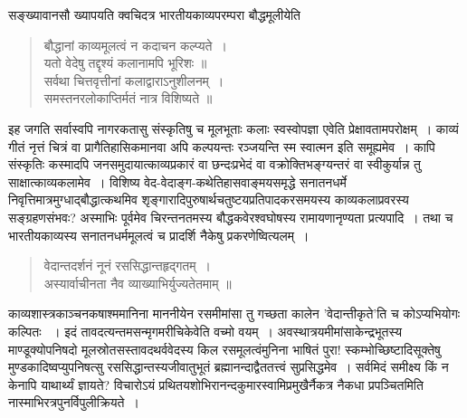 {\dev सङ्ख्यावानसौ ख्यापयति क्वचिदत्र भारतीयकाव्यपरम्परा बौद्धमूलीयेति}
\begin{quote}
{\dev बौद्धानां काव्यमूलत्वं न कदाचन कल्प्यते~।}\\
{\dev यतो वेदेषु तद्दृश्यं कलानामपि भूरिशः ॥}\\[5pt]
{\dev सर्वथा चित्तवृत्तीनां कलाद्वाराऽनुशीलनम्~।}\\
{\dev समस्तनरलोकाप्तिर्मतं नात्र विशिष्यते ॥}
\end{quote}

{\dev इह जगति सर्वास्वपि नागरकतासु संस्कृतिषु च मूलभूताः कलाः स्वस्वोपज्ञा एवेति प्रेक्षावता\-मपरोक्षम्~। काव्यं गीतं नृत्तं चित्रं वा प्रागैतिहासिकमानवा अपि कल्पयन्तः रञ्जयन्ति स्म स्वात्मन इति समूह्यमेव~। कापि संस्कृतिः कस्मादपि जनसमुदायात्काव्यप्रकारं वा छन्दःप्रभेदं वा वक्रोक्तिभङ्ग्यन्तरं वा स्वीकुर्यान्न तु साक्षात्काव्यकलामेव~। विशिष्य वेद-वेदाङ्ग-कथेतिहास\-वाङ्मयसमृद्धे सनातनधर्मे निवृत्तिमात्रमुग्धाद्बौद्धात्कथमिव शृङ्गारादिपुरुषार्थचतुष्टयप्रतिपाद\-करसमयस्य काव्यकलाप्रवरस्य सङ्ग्रहणसंभवः? अस्माभिः पूर्वमेव चिरन्तनतमस्य बौद्ध\-कवेरश्वघोषस्य रामायणानृण्यता प्रत्यपादि~। तथा च भारतीयकाव्यस्य सनातनधर्ममूलत्वं च प्रादर्शि नैकेषु प्रकरणेष्वित्यलम्~।}
\begin{quote}
{\dev वेदान्तदर्शनं नूनं रससिद्धान्तहृद्गतम्~।}\\
{\dev अस्यार्वाचीनता नैव व्याख्याभिर्युज्यतेतमाम् ॥}
\end{quote}

{\dev काव्यशास्त्रकाञ्चनकषाश्ममानिना माननीयेन रसमीमांसा तु गच्छता कालेन ’वेदान्तीकृते’ति च कोऽप्यभियोगः कल्पितः} {\dev~। इदं तावदत्यन्तमसन्मृगमरीचि\-केवेति वच्मो वयम्~। अवस्था\-त्रयमीमांसाकेन्द्रभूतस्य माण्डूक्योपनिषदो मूलस्रोतसस्तावद\-थर्ववेदस्य किल रसमूलत्वं\break मुनिना भाषितं पुरा! स्कम्भोच्छिष्टादिसूक्तेषु मुण्डकादिष्वप्युपनि\-षत्सु रस\-सिद्धान्तस्य\break जीवातुभूतं ब्रह्मानन्दाद्वैततत्त्वं सुप्रसिद्धमेव~। सर्वमिदं समीक्ष्य किं न केनापि याथार्थ्यं ज्ञायते? विचारोऽयं प्रथितयशोभिरानन्दकुमारस्वामिप्रमुखैर्नैकत्र नैकधा प्रपञ्चितमिति नास्माभिरत्र\break पुनर्विपुलीक्रियते~।}   


